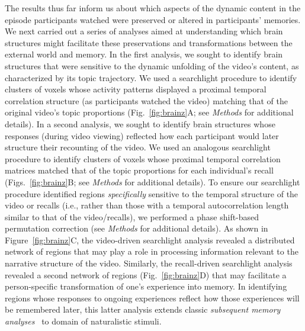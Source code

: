 \documentclass{article}
\begin{document}
The results thus far inform us about which aspects of the dynamic content in the episode participants watched were preserved or altered in participants' memories.  We next carried out a series of analyses aimed at understanding which brain structures might facilitate these preservations and transformations between the external world and memory.  In the first analysis, we sought to identify brain structures that were sensitive to the dynamic unfolding of the video's content, as characterized by its topic trajectory.  We used a searchlight procedure to identify clusters of voxels whose activity patterns displayed a proximal temporal correlation structure (as participants watched the video) matching that of the original video's topic proportions (Fig.~\ref{fig:brainz}A; see \textit{Methods} for additional details).  In a second analysis, we sought to identify brain structures whose responses (during video viewing) reflected how each participant would later structure their recounting of the video.  We used an analogous searchlight procedure to identify clusters of voxels whose proximal temporal correlation matrices matched that of the topic proportions for each individual's recall (Figs.~\ref{fig:brainz}B; see \textit{Methods} for additional details).  To ensure our searchlight procedure identified regions \textit{specifically} sensitive to the temporal structure of the video or recalls (i.e., rather than those with a temporal autocorrelation length similar to that of the video/recalls), we performed a phase shift-based permutation correction (see \textit{Methods} for additional details). As shown in Figure~\ref{fig:brainz}C, the video-driven searchlight analysis revealed a distributed network of regions that may play a role in processing information relevant to the narrative structure of the video.  Similarly, the recall-driven searchlight analysis revealed a second network of regions (Fig.~\ref{fig:brainz}D) that may facilitate a person-specific transformation of one's experience into memory.  In identifying regions whose responses to ongoing experiences reflect how those experiences will be remembered later, this latter analysis extends classic \textit{subsequent memory analyses}~\citep[e.g.,][]{PallWagn02} to domain of naturalistic stimuli.
\end{document}
